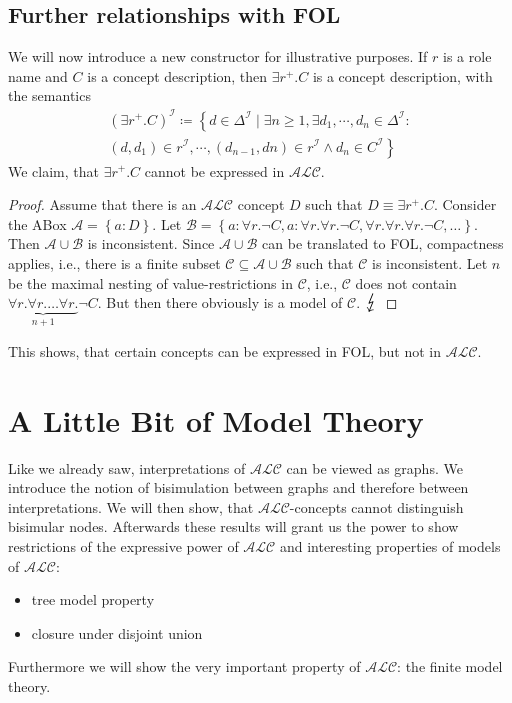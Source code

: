 \newpage
\section{Further relationships with FOL}
We will now introduce a new constructor for illustrative purposes.
If $r$ is a role name and $C$ is a concept description, then $\exists r^+.C $
is a concept description, with the semantics
\[
\begin{split}
	(\exists r^+.C)^\mathcal{I} \coloneqq \left\{ d \in \Delta^{\mathcal{I}} \mid \exists n \geq 1, \exists d_1,\cdots, d_n \in \Delta^\mathcal{I} : \right.\\
		\left. (d,d_1) \in r^\mathcal{I}, \cdots, (d_{n-1},dn) \in r^\mathcal{I} \land d_n \in C^\mathcal{I}\right\}
\end{split}
\]
We claim, that $\exists r^+.C$ cannot be expressed in $\mathcal{ALC}$.
\begin{proof}
	Assume that there is an $\mathcal{ALC}$ concept $D$ such that $D \equiv \exists r^+.C$.
	Consider the ABox $\mathcal{A} = \left\{ a:D \right\}$.
	Let $ \mathcal{B} = \left\{ a : \forall r.\neg C, a: \forall r.\forall r.\neg C, \forall r.\forall r.\forall r.\neg C,\ldots \right\}$.
	Then $\mathcal{A} \cup \mathcal{B}$ is inconsistent.
	Since $\mathcal{A} \cup \mathcal{B}$ can be translated to FOL, compactness applies, i.e.,
	there is a finite subset $\mathcal{C} \subseteq \mathcal{A} \cup \mathcal{B}$ such that $\mathcal{C}$ is inconsistent.
	Let $n$ be the maximal nesting of value-restrictions in $\mathcal{C}$, i.e.,
	$\mathcal{C}$ does not contain $\underbrace{\forall r. \forall r. \ldots \forall r.}_{n+1} \neg C$.
	But then there obviously is a model of $\mathcal{C}$. $\contra$
\end{proof}
This shows, that certain concepts can be expressed in FOL, but not in $\mathcal{ALC}$.

\chapter{A Little Bit of Model Theory}
Like we already saw, interpretations of $\mathcal{ALC}$ can be viewed as graphs.
We introduce the notion of bisimulation between graphs and therefore between interpretations.
We will then show, that $\mathcal{ALC}$-concepts cannot distinguish bisimular nodes.
Afterwards these results will grant us the power to show restrictions of the expressive power of $\mathcal{ALC}$ and
interesting properties of models of $\mathcal{ALC}$:
\begin{itemize}
	\item tree model property
	\item closure under disjoint union
\end{itemize}
Furthermore we will show the very important property of $\mathcal{ALC}$: the finite model theory.


